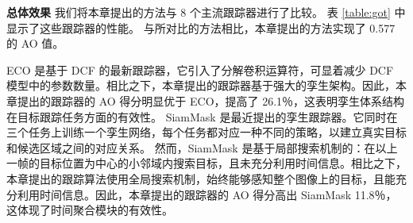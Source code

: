 \textbf{总体效果}
我们将本章提出的方法与 8 个主流跟踪器进行了比较。
表 \ref{table:got} 中显示了这些跟踪器的性能。
与所对比的方法相比，本章提出的方法实现了 0.577 的 AO 值。

ECO \cite{danelljan2017eco} 是基于 DCF 的最新跟踪器，它引入了分解卷积运算符，可显着减少 DCF 模型中的参数数量。相比之下，本章提出的跟踪器基于强大的孪生架构。因此，本章提出的跟踪器的 AO 得分明显优于 ECO，提高了 26.1％，这表明孪生体系结构在目标跟踪任务方面的有效性。
SiamMask \cite{Wang2018SiamMask} 是最近提出的孪生跟踪器。它同时在三个任务上训练一个孪生网络，每个任务都对应一种不同的策略，以建立真实目标和候选区域之间的对应关系。
然而，SiamMask 是基于局部搜索机制的：在以上一帧的目标位置为中心的小邻域内搜索目标，且未充分利用时间信息。相比之下，本章提出的跟踪算法使用全局搜索机制，始终能够感知整个图像上的目标，且能充分利用时间信息。因此，本章提出的跟踪器的 AO 得分高出 SiamMask 11.8％，这体现了时间聚合模块的有效性。


